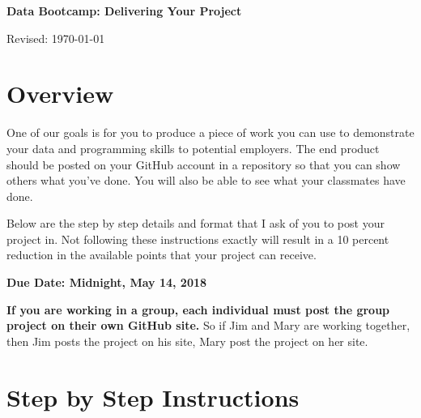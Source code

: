 


\pagestyle{headandfoot}
\runningheadrule
\firstpageheadrule
{}
\runningfooter{}{}{}



\bigskip\bigskip
\centerline{\Large \bf Data Bootcamp:  Delivering Your Project}
\centerline{Revised: \today}

\section*{Overview}

One of our goals is for you to produce a piece of work you can use to demonstrate your data and programming skills to potential employers. The end product should be posted on your GitHub account in a repository so that
you can show others what you've done. You will also be able to see what your classmates have done.

Below are the step by step details and format that I ask of you to post your project in. Not following these instructions exactly will result in a 10 percent reduction in the available points that your project can receive.

\textbf{Due Date: Midnight, May 14, 2018}

\textbf{If you are working in a group, each individual must post the group project on their own GitHub site.} So if Jim and Mary are working together, then Jim posts the project on his site, Mary post the project on her site.

\section*{Step by Step Instructions}


